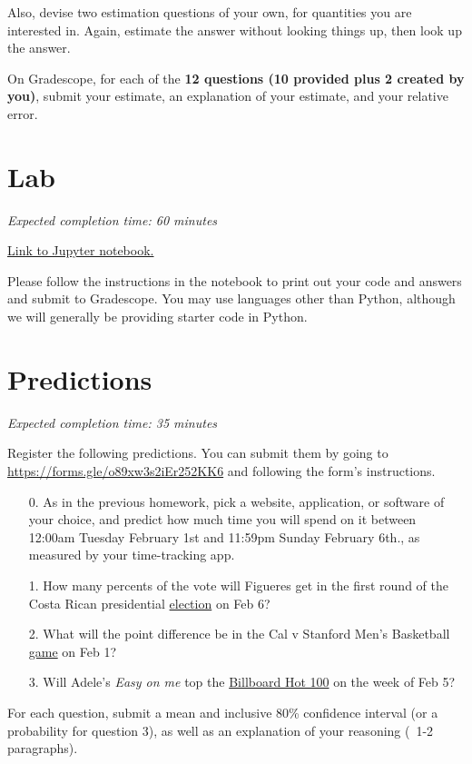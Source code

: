 \documentclass[11pt]{article}
\begin{document}
Also, devise two estimation questions of your own, for quantities you are interested in. Again, estimate the answer without looking things up, then look up the answer.

On Gradescope, for each of the \textbf{12 questions (10 provided plus 2 created by you)}, submit your estimate, an explanation of your estimate, and your relative error.


\section*{Lab}

\emph{Expected completion time: 60 minutes}

\href{https://datahub.berkeley.edu/hub/user-redirect/git-pull?repo=https%3A%2F%2Fgithub.com%2Fjs-d%2Fstat-157-260-website&urlpath=tree%2Fstat-157-260-website%2Fhw%2Fhw2%2Fhw2_lab.ipynb&branch=main}{Link to Jupyter notebook.} 

Please follow the instructions in the notebook to print out your code and answers and submit to Gradescope. You may use languages other than Python, although we will generally be providing starter code in Python.



\section*{Predictions}

\emph{Expected completion time: 35 minutes}

Register the following predictions. You can submit them by going to \url{https://forms.gle/o89xw3s2iEr252KK6} and following the form's instructions.

\begin{enumerate}
	\item[0.] As in the previous homework, pick a website, application, or software of your choice, and predict how much time you will spend on it between 12:00am Tuesday February 1st and 11:59pm Sunday February 6th., as measured by your time-tracking app.
	
	\item[1.] How many percents of the vote will Figueres get in the first round of the Costa Rican presidential \href{https://en.wikipedia.org/wiki/2022_Costa_Rican_general_election}{election} on Feb 6?
	
	\item[2.] What will the point difference be in the Cal v Stanford Men's Basketball \href{https://pac-12.com/mens-basketball/event/2022/01/02/california-stanford}{game} on Feb 1?
	
	\item[3.] Will Adele's \textit{Easy on me} top the \href{https://www.billboard.com/charts/hot-100/}{Billboard Hot 100} on the week of Feb 5?
	
\end{enumerate}

For each question, submit a mean and inclusive 80\% confidence interval (or a probability for question 3), as well as an explanation of your reasoning (~1-2 paragraphs).
\end{document}
